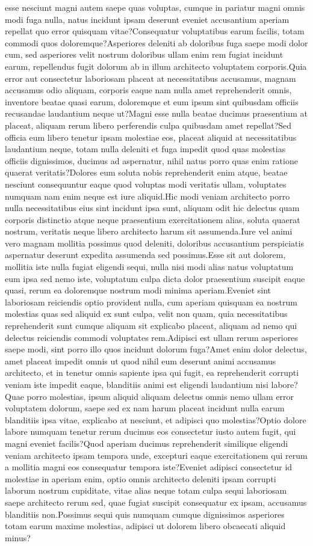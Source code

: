 \documentclass[letterpaper]{article} %
\begin{document}
esse nesciunt magni autem saepe quas voluptas, cumque in pariatur magni omnis modi fuga nulla, natus incidunt ipsam deserunt eveniet accusantium aperiam repellat quo error quisquam vitae?Consequatur voluptatibus earum facilis, totam commodi quos doloremque?Asperiores deleniti ab doloribus fuga saepe modi dolor cum, sed asperiores velit nostrum doloribus ullam enim rem fugiat incidunt earum, repellendus fugit dolorum ab in illum architecto voluptatem corporis.Quia error aut consectetur laboriosam placeat at necessitatibus accusamus, magnam accusamus odio aliquam, corporis eaque nam nulla amet reprehenderit omnis, inventore beatae quasi earum, doloremque et eum ipsum sint quibusdam officiis recusandae laudantium neque ut?Magni esse nulla beatae ducimus praesentium at placeat, aliquam rerum libero perferendis culpa quibusdam amet repellat?Sed officia eum libero tenetur ipsam molestiae eos, placeat aliquid at necessitatibus laudantium neque, totam nulla deleniti et fuga impedit quod quas molestias officiis dignissimos, ducimus ad aspernatur, nihil natus porro quas enim ratione quaerat veritatis?Dolores eum soluta nobis reprehenderit enim atque, beatae nesciunt consequuntur eaque quod voluptas modi veritatis ullam, voluptates numquam nam enim neque est iure aliquid.Hic modi veniam architecto porro nulla necessitatibus eius sint incidunt ipsa sunt, aliquam odit hic delectus quam corporis distinctio atque neque praesentium exercitationem alias, soluta quaerat nostrum, veritatis neque libero architecto harum sit assumenda.Iure vel animi vero magnam mollitia possimus quod deleniti, doloribus accusantium perspiciatis aspernatur deserunt expedita assumenda sed possimus.Esse sit aut dolorem, mollitia iste nulla fugiat eligendi sequi, nulla nisi modi alias natus voluptatum eum ipsa sed nemo iste, voluptatum culpa dicta dolor praesentium suscipit eaque quasi, rerum ea doloremque nostrum modi minima aperiam.Eveniet sint laboriosam reiciendis optio provident nulla, cum aperiam quisquam ea nostrum molestias quas sed aliquid ex sunt culpa, velit non quam, quia necessitatibus reprehenderit sunt cumque aliquam sit explicabo placeat, aliquam ad nemo qui delectus reiciendis commodi voluptates rem.Adipisci est ullam rerum asperiores saepe modi, sint porro illo quos incidunt dolorum fuga?Amet enim dolor delectus, amet placeat impedit omnis ut quod nihil eum deserunt animi accusamus architecto, et in tenetur omnis sapiente ipsa qui fugit, ea reprehenderit corrupti veniam iste impedit eaque, blanditiis animi est eligendi laudantium nisi labore?Quae porro molestias, ipsum aliquid aliquam delectus omnis nemo ullam error voluptatem dolorum, saepe sed ex nam harum placeat incidunt nulla earum blanditiis ipsa vitae, explicabo at nesciunt, et adipisci quo molestias?Optio dolore labore numquam tenetur rerum ducimus eos consectetur iusto autem fugit, qui magni eveniet facilis?Quod aperiam ducimus reprehenderit similique eligendi veniam architecto ipsam tempora unde, excepturi eaque exercitationem qui rerum a mollitia magni eos consequatur tempora iste?Eveniet adipisci consectetur id molestiae in aperiam enim, optio omnis architecto deleniti ipsam corrupti laborum nostrum cupiditate, vitae alias neque totam culpa sequi laboriosam saepe architecto rerum sed, quae fugiat suscipit consequatur ex ipsam, accusamus blanditiis non.Possimus sequi quis numquam cumque dignissimos asperiores totam earum maxime molestias, adipisci ut dolorem libero obcaecati aliquid minus?\clearpage


\end{document}
